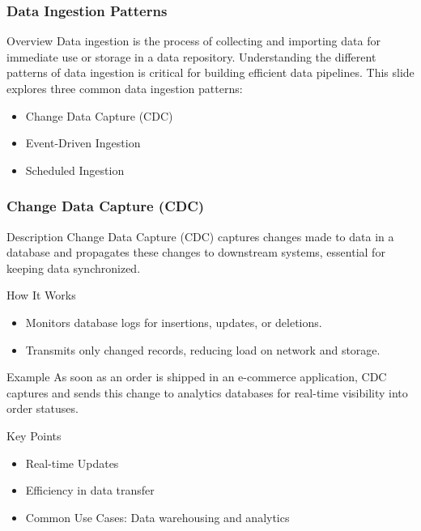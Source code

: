 \documentclass{beamer}
\begin{document}
\begin{frame}[fragile]
    \frametitle{Data Ingestion Patterns}
    \begin{block}{Overview}
        Data ingestion is the process of collecting and importing data for immediate use or storage in a data repository. Understanding the different patterns of data ingestion is critical for building efficient data pipelines. This slide explores three common data ingestion patterns: 
        \begin{itemize}
            \item Change Data Capture (CDC) 
            \item Event-Driven Ingestion 
            \item Scheduled Ingestion
        \end{itemize}
    \end{block}
\end{frame}

\begin{frame}[fragile]
    \frametitle{Change Data Capture (CDC)}
    \begin{block}{Description}
        Change Data Capture (CDC) captures changes made to data in a database and propagates these changes to downstream systems, essential for keeping data synchronized.
    \end{block}
    
    \begin{block}{How It Works}
        \begin{itemize}
            \item Monitors database logs for insertions, updates, or deletions.
            \item Transmits only changed records, reducing load on network and storage.
        \end{itemize}
    \end{block}
    
    \begin{block}{Example}
        As soon as an order is shipped in an e-commerce application, CDC captures and sends this change to analytics databases for real-time visibility into order statuses.
    \end{block}
    
    \begin{block}{Key Points}
        \begin{itemize}
            \item Real-time Updates
            \item Efficiency in data transfer
            \item Common Use Cases: Data warehousing and analytics
        \end{itemize}
    \end{block}
\end{frame}
\end{document}
